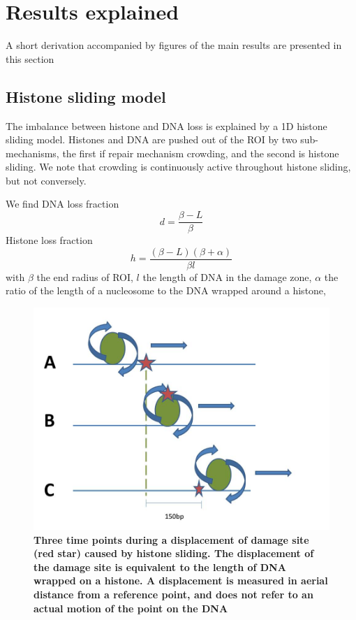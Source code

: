 \documentclass[12pt]{report}
\begin{document}
\section{Results explained}\label{section:ResultsExplained}
       A short derivation accompanied by figures of the main results are presented in this section

		\subsection{Histone sliding model}\label{subsection:HistoneSlidingModel}		   
		The imbalance between histone and DNA loss is explained by a 1D histone sliding model. Histones and DNA are pushed out of the ROI by two sub-mechanisms, the first if repair mechanism crowding, and the second is histone sliding. We note that crowding is continuously active throughout histone sliding, but not conversely. 				

		We find DNA loss fraction
		\begin{equation*}
        d=\frac{\beta-L}{\beta}
		\end{equation*}
		Histone loss fraction 
		\begin{equation*}
			h=\frac{(\beta -L)(\beta+\alpha)}{\beta l}
		\end{equation*}
		with $\beta$ the end radius of ROI, $l$ the length of DNA in the damage zone, $\alpha$ the ratio of the length of a nucleosome to the DNA wrapped around a histone, 
		
				   \begin{figure}[H]
				   	\centering
				   	\includegraphics[width=0.7\linewidth]{Images/SlidingModel/histoneSlidingSingle}
				   	\caption{\tiny{\textbf{Three time points during a displacement of damage site (red star) caused by histone sliding. The displacement of the damage site is equivalent to the length of DNA wrapped on a histone. A displacement is measured in aerial distance from a reference point, and does not refer to an actual motion of the point on the DNA}}}
				   	\label{fig:histoneSlidingSingle}
				   \end{figure}
				   
\end{document}
